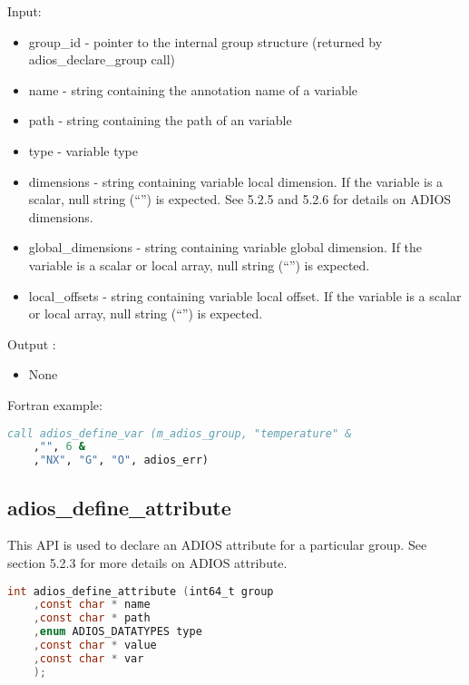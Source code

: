 Input: 
\begin{itemize}
\item group\_id - pointer to the internal group structure (returned by adios\_declare\_group 
call)

\item name - string containing the annotation name of a variable

\item path - string containing the path of an variable 

\item type - variable type 

\item dimensions - string containing variable local dimension. If the variable is a scalar, 
null string (``'') is expected. See 5.2.5 and 5.2.6 for details on ADIOS dimensions.

\item global\_dimensions - string containing variable global dimension. If the variable 
is a scalar or local array, null string (``'') is expected.

\item local\_offsets - string containing variable local offset. If the variable is a 
scalar or local array, null string (``'') is expected.
\end{itemize}

Output :
\begin{itemize}
\item None
\end{itemize}

Fortran example: 
\begin{lstlisting}[language=Fortran,caption={},label={}]
call adios_define_var (m_adios_group, "temperature" &
	,"", 6 &
	,"NX", "G", "O", adios_err)
\end{lstlisting}

\subsection{adios\_define\_attribute}

This API is used to declare an ADIOS attribute for a particular group. See section 
5.2.3 for more details on ADIOS attribute.

\begin{lstlisting}[language=C,caption={},label={}]
int adios_define_attribute (int64_t group
	,const char * name 
	,const char * path
	,enum ADIOS_DATATYPES type
	,const char * value 
	,const char * var
	);
\end{lstlisting}

